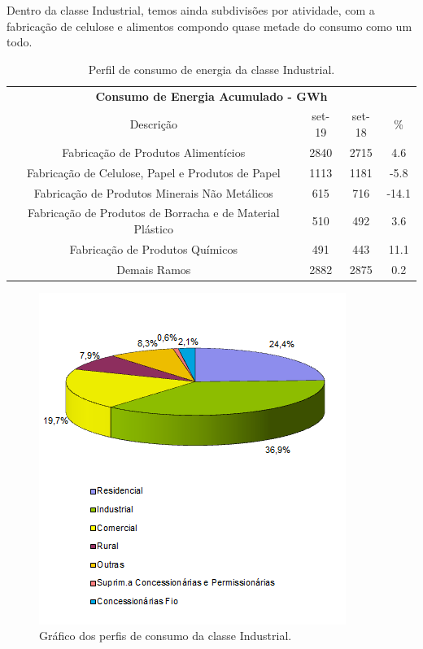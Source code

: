 \documentclass[grad,numbers]{coppe}
\begin{document}
  Dentro da classe Industrial, temos ainda subdivisões por atividade, com a fabricação de celulose e alimentos compondo quase metade do consumo como um todo.
  \begin{table}[H]

  \caption{\label{tab:unnamed-chunk-14}Perfil de consumo de energia da classe Industrial.}
  \centering
  \begin{tabular}[t]{cccc}
  \toprule
  \multicolumn{4}{c}{\textbf{Consumo de Energia Acumulado - GWh}} \\
  \cmidrule(l{3pt}r{3pt}){1-4}
  Descrição & set-19 & set-18 & \%\\
  \midrule
  Fabricação de Produtos Alimentícios & 2840 & 2715 & 4.6\\
  Fabricação de Celulose, Papel e Produtos de Papel & 1113 & 1181 & -5.8\\
  Fabricação de Produtos Minerais Não Metálicos & 615 & 716 & -14.1\\
  Fabricação de Produtos de Borracha e de Material Plástico & 510 & 492 & 3.6\\
  Fabricação de Produtos Químicos & 491 & 443 & 11.1\\
  \addlinespace
  Demais Ramos & 2882 & 2875 & 0.2\\
  \bottomrule
  \end{tabular}
  \end{table}
  \begin{figure}[H]
  \includegraphics[width=1\linewidth]{img/industrial_dist} \caption{Gráfico dos perfis de consumo da classe Industrial.}\label{fig:unnamed-chunk-15}
  \end{figure}
\end{document}
